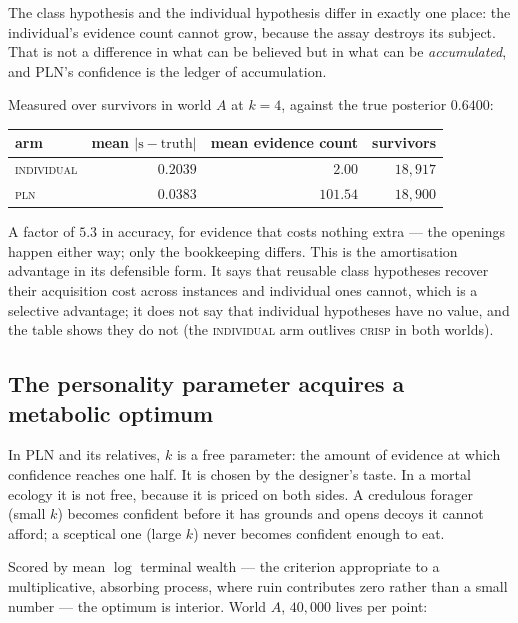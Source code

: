 \documentclass[11pt,a4paper]{article}
\theoremstyle{plain}
\theoremstyle{definition}
\theoremstyle{remark}
\newcommand{\str}{\mathrm{s}}
\begin{document}
The class hypothesis and the individual hypothesis differ in exactly one place:
the individual's evidence count cannot grow, because the assay destroys its
subject. That is not a difference in what can be believed but in what can be
\emph{accumulated}, and PLN's confidence is the ledger of accumulation.

Measured over survivors in world $A$ at $k=4$, against the true posterior
$0.6400$:

\begin{center}
\small
\begin{tabular}{@{}lrrr@{}}
\toprule
arm & mean $|\str - \text{truth}|$ & mean evidence count & survivors \\
\midrule
\textsc{individual} & $0.2039$ & $2.00$ & $18{,}917$ \\
\textsc{pln} & $\mathbf{0.0383}$ & $101.54$ & $18{,}900$ \\
\bottomrule
\end{tabular}
\end{center}

\noindent
A factor of $5.3$ in accuracy, for evidence that costs nothing extra --- the
openings happen either way; only the bookkeeping differs. This is the
amortisation advantage in its defensible form. It says that reusable class
hypotheses recover their acquisition cost across instances and individual ones
cannot, which is a selective advantage; it does not say that individual
hypotheses have no value, and the table shows they do not (the
\textsc{individual} arm outlives \textsc{crisp} in both worlds).

\subsection{The personality parameter acquires a metabolic optimum}

In PLN and its relatives, $k$ is a free parameter: the amount of evidence at
which confidence reaches one half. It is chosen by the designer's taste. In a
mortal ecology it is not free, because it is priced on both sides. A credulous
forager (small $k$) becomes confident before it has grounds and opens decoys it
cannot afford; a sceptical one (large $k$) never becomes confident enough to eat.

Scored by mean $\log$ terminal wealth --- the criterion appropriate to a
multiplicative, absorbing process, where ruin contributes zero rather than a
small number --- the optimum is interior. World $A$, $40{,}000$ lives per point:
\end{document}
